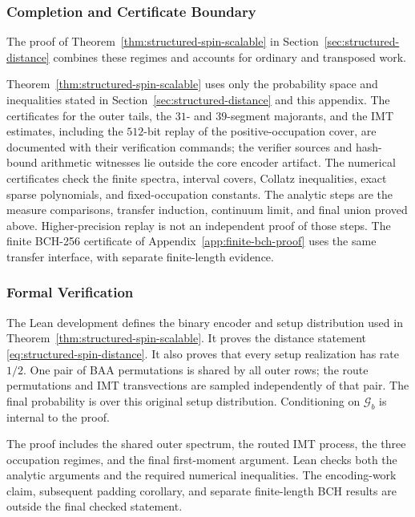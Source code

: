 \subsubsection{Completion and Certificate Boundary}

The proof of Theorem~\ref{thm:structured-spin-scalable} in
Section~\ref{sec:structured-distance} combines these regimes and accounts
for ordinary and transposed work.

Theorem~\ref{thm:structured-spin-scalable} uses only the probability space
and inequalities stated in Section~\ref{sec:structured-distance} and this
appendix. The certificates for the outer tails, the $31$- and $39$-segment
majorants, and the IMT estimates, including the $512$-bit replay of the
positive-occupation cover, are documented with their verification
commands\repositorycite; the verifier sources and hash-bound arithmetic
witnesses lie outside the core encoder artifact. The numerical certificates check
the finite spectra, interval covers, Collatz inequalities, exact sparse
polynomials, and fixed-occupation constants. The analytic steps are the
measure comparisons, transfer induction, continuum limit, and final union
proved above. Higher-precision replay is not an independent proof of those
steps. The finite BCH-256 certificate of
Appendix~\ref{app:finite-bch-proof} uses the same transfer interface, with
separate finite-length evidence.

\subsubsection{Formal Verification}
\label{app:structured-lean}

The Lean development defines the binary encoder and setup distribution
used in Theorem~\ref{thm:structured-spin-scalable}. It proves the distance
statement \eqref{eq:structured-spin-distance}. It also proves that every setup
realization has rate $1/2$. One pair of BAA permutations is shared by all outer rows;
the route permutations and IMT transvections are sampled independently of
that pair. The final probability is over this original setup distribution.
Conditioning on $\mathcal G_b$ is internal to the proof.

The proof includes the shared outer spectrum, the routed IMT process,
the three occupation regimes, and the final first-moment argument.
Lean checks both the analytic arguments and the required numerical
inequalities. The encoding-work claim, subsequent padding corollary, and
separate finite-length BCH results are outside the final checked statement.

